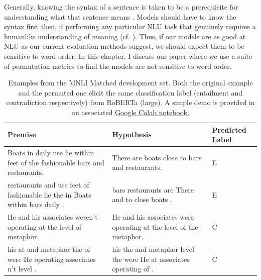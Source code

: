 \documentclass[letterpaper, 12pt]{report}
\begin{document}
Generally, knowing the syntax of a sentence is taken to be a prerequisite for understanding what that sentence means \citep{heim-kratzer-1998-semantics}.
Models should have to know the syntax first then, if performing any particular NLU task that genuinely requires a humanlike understanding of meaning (cf. \citealt{bender-koller-2020-climbing}).
Thus, if our models are as good at NLU as our current evaluation methods suggest, we should expect them to be sensitive to word order.
In this chapter, I discuss our paper \cite{sinha-etal-2021-unnatural} where we use a suite of permutation metrics to find the models are not sensitive to word order.

\begin{table}[t]
    \centering
    \small
    \begin{adjustbox}{max width=0.95\linewidth}
    \begin{tabular}{p{11em}p{9em}p{3em}} %
    \toprule
     \bf Premise & \bf Hypothesis & \bf Predicted Label \\ \midrule
    Boats in daily use lie within feet of the fashionable bars and restaurants.  & There are boats close to bars and restaurants. & E \\
    \addlinespace[0.5em]
    restaurants and use feet of fashionable lie the in Boats within bars daily . & bars restaurants are There and to close boats . & E \\ \midrule
    He and his associates weren't operating at the level of metaphor. & He and his associates were operating at the level of the metaphor. & C\\  \addlinespace[0.5em]
    his at and metaphor the of were He operating associates n't level . & his the and metaphor level the were He at associates operating of . & C\\
    \bottomrule
    \end{tabular}
   \end{adjustbox}
    \caption{Examples from the MNLI Matched development set. Both the original example and the permuted one elicit the same classification label (entailment and contradiction respectively) from RoBERTa (large).
    A simple demo is provided in an associated \href{https://colab.research.google.com/drive/1vv8Xmag1go3dib4vZXUZXAFB4ltDaMH7?usp=sharing}{Google Colab notebook.}}
    \label{tab:unli:example}
\end{table}
\end{document}
